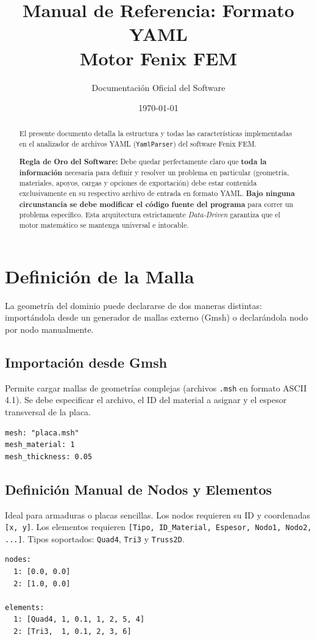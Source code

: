 \documentclass[12pt,a4paper]{article}
\title{\Huge \textbf{Manual de Referencia: Formato YAML} \\ \vspace{0.5cm} \Large Motor Fenix FEM}
\author{Documentación Oficial del Software}
\date{\today}
\begin{document}
\maketitle

\tableofcontents
\vspace{1cm}

\begin{abstract}
El presente documento detalla la estructura y todas las características implementadas en el analizador de archivos YAML (\texttt{YamlParser}) del software Fenix FEM. 

\textbf{Regla de Oro del Software:} Debe quedar perfectamente claro que \textbf{toda la información} necesaria para definir y resolver un problema en particular (geometría, materiales, apoyos, cargas y opciones de exportación) debe estar contenida exclusivamente en su respectivo archivo de entrada en formato YAML. \textbf{Bajo ninguna circunstancia se debe modificar el código fuente del programa} para correr un problema específico. Esta arquitectura estrictamente \textit{Data-Driven} garantiza que el motor matemático se mantenga universal e intocable.
\end{abstract}

\section{Definición de la Malla}
La geometría del dominio puede declararse de dos maneras distintas: importándola desde un generador de mallas externo (Gmsh) o declarándola nodo por nodo manualmente.

\subsection{Importación desde Gmsh}
Permite cargar mallas de geometrías complejas (archivos \texttt{.msh} en formato ASCII 4.1). Se debe especificar el archivo, el ID del material a asignar y el espesor transversal de la placa.
\begin{lstlisting}
mesh: "placa.msh"
mesh_material: 1
mesh_thickness: 0.05
\end{lstlisting}

\subsection{Definición Manual de Nodos y Elementos}
Ideal para armaduras o placas sencillas. Los nodos requieren su ID y coordenadas \texttt{[x, y]}. Los elementos requieren \texttt{[Tipo, ID\_Material, Espesor, Nodo1, Nodo2, ...]}. Tipos soportados: \texttt{Quad4}, \texttt{Tri3} y \texttt{Truss2D}.
\begin{lstlisting}
nodes:
  1: [0.0, 0.0]
  2: [1.0, 0.0]

elements:
  1: [Quad4, 1, 0.1, 1, 2, 5, 4]
  2: [Tri3,  1, 0.1, 2, 3, 6]
\end{lstlisting}
\end{document}

